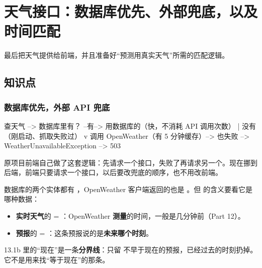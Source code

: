 \chapter{天气接口：数据库优先、外部兜底，以及时间匹配}

最后把天气提供给前端，并且准备好“预测用真实天气”所需的匹配逻辑。


\section{知识点}

\subsection{数据库优先，外部 API 兜底}

\begin{plaincode}
查天气 --> 数据库里有？ --有--> 用数据库的（快，不消耗 API 调用次数）
                  |
                  没有（刚启动、抓取失败过）
                  v
            调用 OpenWeather（有 5 分钟缓存）--> 也失败 --> WeatherUnavailableException --> 503
\end{plaincode}

原项目前端自己做了这套逻辑：先请求一个接口，失败了再请求另一个。现在挪到后端，前端只要请求一个接口，以后要改兜底的顺序，也不用改前端。

\begin{note}
数据库的两个实体都有 ，OpenWeather 客户端返回的也是 。但  的含义要看它是哪种数据：
\begin{itemize}
  \item \textbf{实时天气}的  = ：OpenWeather \textbf{测量}的时间，一般是几分钟前（Part 12）。
  \item \textbf{预报}的  = ：这条预报说的是\textbf{未来哪个时刻}。
\end{itemize}
13.1b 里的“现在”是一条\textbf{分界线}：只留  不早于现在的预报，已经过去的时刻扔掉。它不是用来找“等于现在”的那条。
\end{note}

